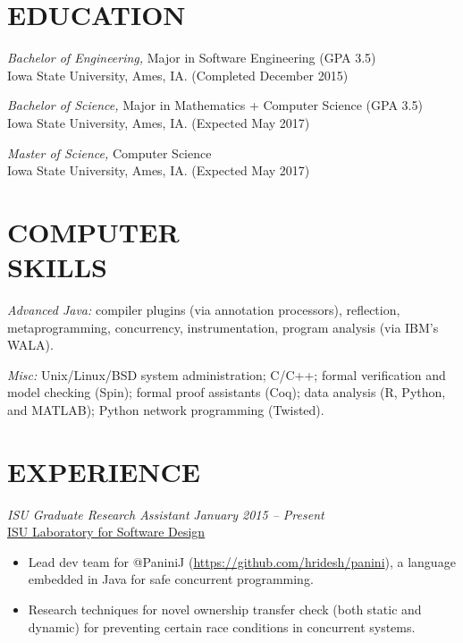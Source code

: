 \documentclass[margin, 10pt]{res} %
\begin{document}
\begin{resume}


\section{EDUCATION}

{\sl Bachelor of Engineering,} Major in Software Engineering (GPA 3.5) \\
Iowa State University, Ames, IA. (Completed December 2015)

{\sl Bachelor of Science,} Major in Mathematics + Computer Science (GPA 3.5) \\
Iowa State University, Ames, IA. (Expected May 2017)

{\sl Master of Science,} Computer Science \\
Iowa State University, Ames, IA. (Expected May 2017)



\section{COMPUTER \\ SKILLS}

{\sl Advanced Java:} compiler plugins (via annotation processors), reflection,
  metaprogramming, concurrency, instrumentation, program analysis (via IBM's
  WALA).

{\sl Misc:} Unix/Linux/BSD system administration; C/C++; formal verification and
  model checking (Spin); formal proof assistants (Coq); data analysis (R,
  Python, and MATLAB); Python network programming (Twisted).


\section{EXPERIENCE}

{\sl ISU Graduate Research Assistant}   \hfill {\sl January 2015 -- Present} \\
  \href{http://design.cs.iastate.edu/}{ISU Laboratory for Software Design}
  \begin{itemize} \itemsep -1pt %
    \item Lead dev team for @PaniniJ (\url{https://github.com/hridesh/panini}),
          a language embedded in Java for safe concurrent programming.
    \item Research techniques for novel ownership transfer check (both static
          and dynamic) for preventing certain race conditions in concurrent
          systems.
  \end{itemize}


\end{resume}
\end{document}

